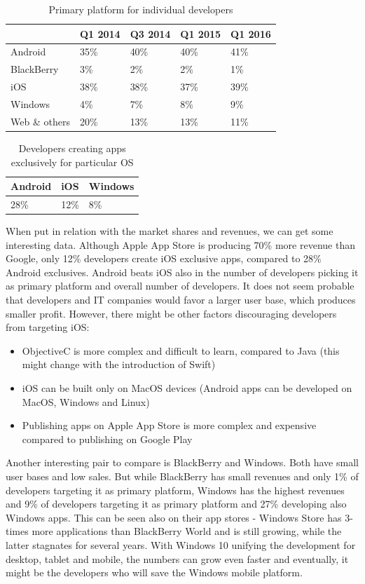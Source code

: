 \documentclass[english,master,public,dept460,male,cpdeclaration,oneside]{diploma}
\begin{document}
\begin{table}
	\centering
	\caption{Primary platform for individual developers}
	\begin{tabular}{l l l l l}		
		\toprule
		 & Q1 2014 & Q3 2014 & Q1 2015 & Q1 2016 \\
		\midrule
		Android & 35\% & 40\% & 40\% & 41\% \\
		BlackBerry & 3\% & 2\% & 2\% & 1\% \\
		iOS & 38\% & 38\% & 37\% & 39\% \\
		Windows & 4\% & 7\% & 8\% & 9\% \\
		Web \& others & 20\% & 13\% & 13\% & 11\% \\
		\midrule
	\end{tabular}
\end{table}

\begin{table}
	\centering
	\caption{Developers creating apps exclusively for particular OS}
	\begin{tabular}{l l l}
		\toprule
		Android & iOS & Windows \\
		\midrule
		28\% & 12\% & 8\% \\
		\midrule
	\end{tabular}
\end{table}

When put in relation with the market shares and revenues, we can get some interesting data. Although Apple App Store is producing 70\% more revenue than Google, only 12\% developers create iOS exclusive apps, compared to 28\% Android exclusives. Android beats iOS also in the number of developers picking it as primary platform and overall number of developers. It does not seem probable that developers and IT companies would favor a larger user base, which produces smaller profit. However, there might be other factors discouraging developers from targeting iOS:
\begin{itemize}
	\item ObjectiveC is more complex and difficult to learn, compared to Java (this might change with the introduction of Swift)
	\item iOS can be built only on MacOS devices (Android apps can be developed on MacOS, Windows and Linux)
	\item Publishing apps on Apple App Store is more complex and expensive compared to publishing on Google Play
\end{itemize}

Another interesting pair to compare is BlackBerry and Windows. Both have small user bases and low sales. But while BlackBerry has small revenues and only 1\% of developers targeting it as primary platform, Windows has the highest revenues and 9\% of developers targeting it as primary platform and 27\% developing also Windows apps. This can be seen also on their app stores - Windows Store has 3-times more applications than BlackBerry World and is still growing, while the latter stagnates for several years. With Windows 10 unifying the development for desktop, tablet and mobile, the numbers can grow even faster and eventually, it might be the developers who will save the Windows mobile platform.
\end{document}
